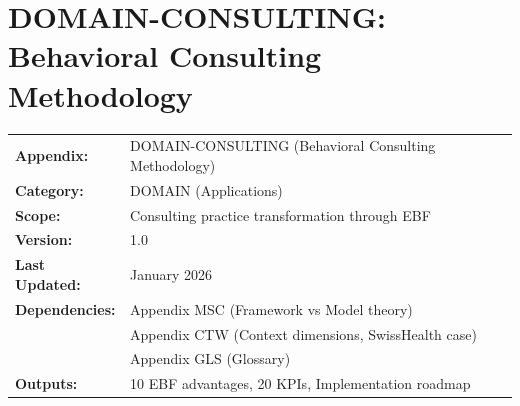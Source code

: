 %
%
%
%
%

\chapter{DOMAIN-CONSULTING: Behavioral Consulting Methodology}
\label{app:domain-consulting}


\begin{tcolorbox}[colback=blue!5!white, colframe=blue!75!black,
    title=\textbf{Appendix BHC: Application Domain}]

\begin{tabular}{@{}ll@{}}
\textbf{Appendix:} & DOMAIN-CONSULTING (Behavioral Consulting Methodology) \\
\textbf{Category:} & DOMAIN (Applications) \\
\textbf{Scope:} & Consulting practice transformation through EBF \\
\textbf{Version:} & 1.0 \\
\textbf{Last Updated:} & January 2026 \\
\textbf{Dependencies:} & Appendix MSC (Framework vs Model theory) \\
 & Appendix CTW (Context dimensions, SwissHealth case) \\
 & Appendix GLS (Glossary) \\
\textbf{Outputs:} & 10 EBF advantages, 20 KPIs, Implementation roadmap \\
\end{tabular}

\end{tcolorbox}

